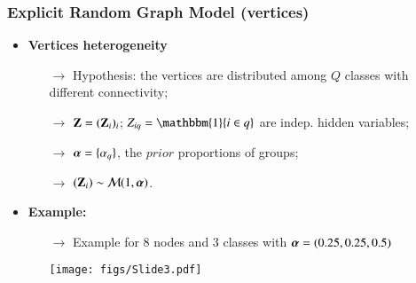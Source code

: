 \documentclass{beamer}
\newcommand{\Zbf}{{\bf Z}}
\newcommand{\alphabf}{\text{\mathversion{bold}{$\alpha$}}}
\begin{document}
\begin{frame}
  \frametitle{Explicit Random Graph Model (vertices)}
  \begin{itemize}
  \item \textbf{Vertices heterogeneity}
    \begin{itemize}
    \item[\bf{$\rightarrow$}] Hypothesis: the vertices are distributed among $Q$ classes with
      different connectivity; \medskip
      \pause
    \item[\bf{$\rightarrow$}] $\Zbf=(\Zbf_i)_i$; \medskip
      $Z_{iq}=\mathbbm{1}\{i \in q\}$ are indep. hidden variables; \medskip
    \item[\bf{$\rightarrow$}] $\alphabf=\{\alpha_q\}$, the $prior$
      proportions of groups; \medskip
    \item[\bf{$\rightarrow$}] $(\Zbf_i)\sim \mathcal{M}(1,\alphabf)$.
    \end{itemize} \bigskip

    \pause
  \item
    \textbf{Example:}
    \begin{itemize}
    \item[\bf{$\rightarrow$}] Example for $8$ nodes and $3$ classes with
      $\alphabf=(0.25,0.25,0.5)$
      \begin{overprint}
        \texttt{[image: figs/Slide3.pdf]}
      \end{overprint}
    \end{itemize}
  \end{itemize}

\end{frame}
\end{document}
